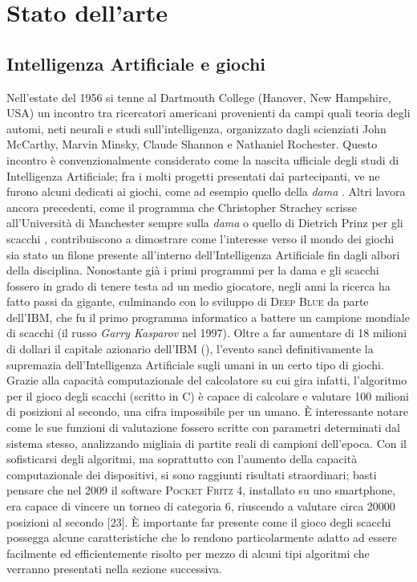 \chapter*{Stato dell'arte}
\graphicspath{{Chapter2/Chapter2Figs/PNG/}{Chapter2/Chapter2Figs/PDF/}{Chapter2/Chapter2Figs/}}

\section{Intelligenza Artificiale e giochi}

Nell'estate del 1956 si tenne al Dartmouth College (Hanover, New Hampshire, USA) un incontro tra ricercatori americani provenienti da campi quali teoria degli automi, neti neurali e studi sull'intelligenza, organizzato dagli scienziati John McCarthy, Marvin Minsky, Claude Shannon e Nathaniel Rochester.
Questo incontro è convenzionalmente considerato come la nascita ufficiale degli studi di Intelligenza Artificiale; fra i molti progetti presentati dai partecipanti, ve ne furono alcuni dedicati ai giochi, come ad esempio quello della \emph{dama} \cite{randw}.
Altri lavora ancora precedenti, come il programma che Christopher Strachey scrisse all'Università di Manchester sempre sulla \emph{dama} o quello di Dietrich Prinz per gli scacchi \cite{historyofcomputing}, contribuiscono a dimostrare come l'interesse verso il mondo dei giochi sia stato un filone presente all'interno dell'Intelligenza Artificiale fin dagli albori della disciplina.
Nonostante già i primi programmi per la dama e gli scacchi fossero in grado di tenere testa ad un medio giocatore, negli anni la ricerca ha fatto passi da gigante, culminando con lo sviluppo di \textsc{Deep Blue} da parte dell'\textsc{IBM}, che fu il primo programma informatico a battere un campione mondiale di scacchi (il russo \emph{Garry Kasparov} nel 1997).
Oltre a far aumentare di 18 milioni di dollari il capitale azionario dell'\textsc{IBM} (\cite{randw}), l'evento sancì definitivamente la supremazia dell'Intelligenza Artificiale sugli umani in un certo tipo di giochi.
Grazie alla capacità computazionale del calcolatore su cui gira infatti, l’algoritmo per il gioco degli scacchi (scritto in C) è capace di calcolare e valutare 100 milioni di posizioni al secondo, una cifra impossibile per un umano.
È interessante notare come le sue funzioni di valutazione fossero scritte con parametri determinati dal sistema stesso, analizzando migliaia di partite reali di campioni dell'epoca.
Con il sofisticarsi degli algoritmi, ma soprattutto con l'aumento della capacità computazionale dei dispositivi, si sono raggiunti risultati straordinari; basti pensare che nel 2009 il software \textsc{Pocket Fritz 4}, installato su uno smartphone, era capace di vincere un torneo di categoria 6, riuscendo a valutare circa 20000 posizioni al secondo [23].
È importante far presente come il gioco degli scacchi possegga alcune caratteristiche che lo rendono particolarmente adatto ad essere facilmente ed efficientemente risolto per mezzo di alcuni tipi algoritmi che verranno presentati nella sezione successiva.\\




